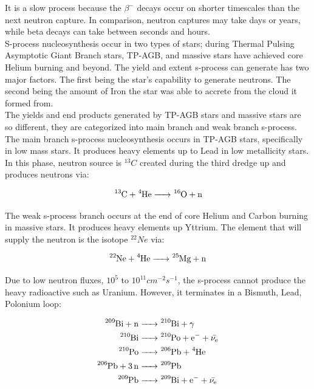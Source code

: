 \documentclass{article}
\begin{document}
\noindent It is a slow process because the $\beta^{-}$ decays occur on shorter timescales than the next neutron capture. In comparison, 
neutron captures may take days or years, while beta decays can take between seconds and hours.\\

\noindent S-process nucleosynthesis occur in two types of stars; during Thermal Pulsing Asymptotic Giant Branch stars, TP-AGB, and massive stars 
have achieved core Helium burning and beyond. The yield and extent s-process can generate has two major factors. The first being the 
star's capability to generate neutrons. The second being the amount of Iron the star was able to accrete from the cloud it formed from.\\

\noindent The yields and end products generated by TP-AGB stars and massive stars are so different, they are categorized into main branch and weak 
branch s-process. The main branch s-process nucleosynthesis occurs in TP-AGB stars, specifically in low mass stars. It produces heavy 
elements up to Lead in low metallicity stars. In this phase, neutron source is $^{13}C$ created during the third dredge up \cite{kww} and 
produces neutrons via:

\begin{equation*}
\ce{^13C + ^4He -> ^16O + n} 
\end{equation*}

\noindent The weak s-process branch occurs at the end of core Helium and Carbon burning in massive stars. It produces heavy elements up Yttrium.
The element that will supply the neutron is the isotope $^{22}Ne$ via:

\begin{equation*}
    \ce{^22Ne + ^4He -> ^25Mg + n}
\end{equation*}

\noindent Due to low neutron fluxes, $10^{5}$ to $10^{11} cm^{-2}s^{-1}$, the s-process cannot produce the heavy radioactive such as Uranium. 
However, it terminates in a Bismuth, Lead, Polonium loop:

\begin{align*}
    \ce{^209Bi + n &-> ^210Bi + \gamma}\\
    \ce{^210Bi &-> ^210Po + e^- + \bar{\nu_{e}}}\\
    \ce{^210Po &-> ^206Pb + ^4He}\\
    \ce{^206Pb + 3n &-> ^209Pb}\\
    \ce{^209Pb &-> ^209Bi + e^- + \bar{\nu_{e}}}
\end{align*}
\end{document}
